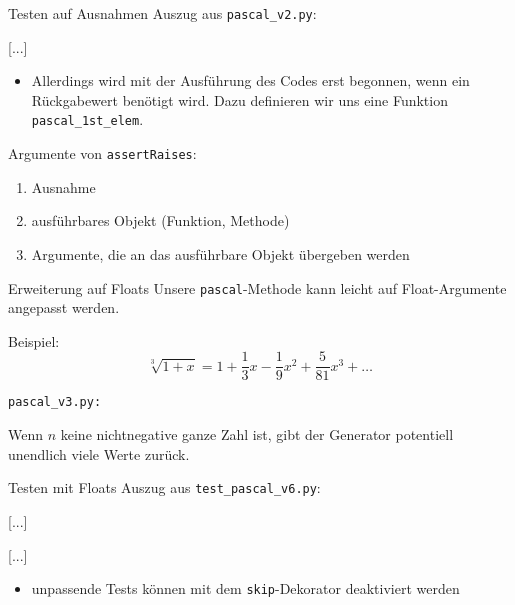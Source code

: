 \documentclass[t, utf8x, 10pt]{beamer}
\begin{document}
\begin{frame}{Testen auf Ausnahmen}
 Auszug aus \texttt{pascal\_v2.py}:
 \begin{footnotesize}
  
 \end{footnotesize}
 [...]

 \begin{itemize}
  \item Allerdings wird mit der Ausführung des Codes erst begonnen, wenn
	ein Rückgabewert benötigt wird. Dazu definieren wir uns eine
	Funktion \texttt{pascal\_1st\_elem}.
 \end{itemize}

 \begin{footnotesize}
  
 \end{footnotesize}

 Argumente von \texttt{assertRaises}:
 \begin{enumerate}
  \item Ausnahme
  \item ausführbares Objekt (Funktion, Methode)
  \item Argumente, die an das ausführbare Objekt übergeben werden
 \end{enumerate}
\end{frame}


\begin{frame}{Erweiterung auf Floats}
 Unsere \texttt{pascal}-Methode kann leicht auf Float-Argumente angepasst werden.
 
 Beispiel:
 \begin{displaymath}
  \sqrt[3]{1+x} = 1+\frac{1}{3}x-\frac{1}{9}x^2+\frac{5}{81}x^3+\ldots
 \end{displaymath}

 \texttt{pascal\_v3.py:}
 

 Wenn $n$ keine nichtnegative ganze Zahl ist, gibt der Generator potentiell unendlich
 viele Werte zurück.
\end{frame}


\begin{frame}{Testen mit Floats}
 Auszug aus \texttt{test\_pascal\_v6.py}:
 \begin{small}
  
  [...]
  
  [...]
  
 \end{small}
 \begin{itemize}
  \item unpassende Tests können mit dem \texttt{skip}-Dekorator deaktiviert werden
 \end{itemize}
\end{frame}
\end{document}
